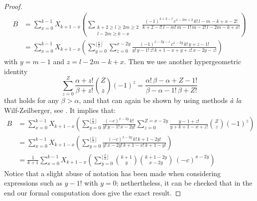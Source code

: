 \documentclass[10pt]{amsart}
\begin{document}
\begin{proof}
 \begin{align*}
 B&=\sum_{x=0}^{k-1}X_{k+1-x}\left(\sum_{\substack{k+2\geq l \geq 2m \geq 2\\l-2m\geq k-x}} \frac{(-1)^{k+2-l}\,c^{x-2m+2}\,k!\,l-m-k+x-2!}{k+2-l!\,l-m!\,m-1!\,m-2!\,l-2m-k+x!}\right)\\
 &=\sum_{x=0}^{k-1}X_{k+1-x}\left(\sum_{y=0}^{\lfloor\frac{x}{2}\rfloor} \sum_{z=0}^{x-2y} \frac{(-1)^{x-2y-z}\,c^{x-2y}\,k!\,y+z-1!}{y!\,y-1!\,z!\,k+1-x+y+z!\,x-2y-z!}\right)
 \end{align*}
 with $y=m-1$ and $z=l-2m-k+x$. Then we use another hypergeometric identity
$$\sum_{z=0}^{Z} \frac{\alpha+z!}{\beta+z!}\binom{Z}{z} (-1)^{z}= \frac{\alpha!\,\beta-\alpha+Z-1!}{\beta-\alpha-1!\,\beta+Z!}$$
that holds for any $\beta> \alpha$, and that can again be shown by using methods \emph{\`a la} Wilf-Zeilberger, see \cite{PWZ97}. It implies that:
\begin{align*}
B&=\sum_{x=0}^{k-1}X_{k+1-x}\left(\sum_{y=0}^{\lfloor \frac{x}{2} \rfloor}\frac{(-c)^{x-2y}\,k!}{y!\,y-1!\,x-2y!}\sum_{z=0}^{Z=x-2y} \frac{y-1+z!}{y+k+1-x+z!}\binom{Z}{z}(-1)^{z}\right)\\
&=\sum_{x=0}^{k-1}X_{k+1-x}\left(\sum_{y=0}^{\lfloor \frac{x}{2} \rfloor}\frac{(-c)^{x-2y}\,k!\,k+1-2y!}{y!\,x-2y!\,k+1-x!\,k+1-y!}\right)\\
&=\frac{1}{k+1}\sum_{x=0}^{k-1}X_{k+1-x}\left(\sum_{y=0}^{\lfloor \frac{x}{2} \rfloor} \binom{k+1}{y}\binom{k+1-2y}{x-2y}\,(-c)^{x-2y}\right)
\end{align*}
Notice that a slight abuse of notation has been made when considering expressions such as $y-1!$ with $y=0$; nethertheless, it can be checked that in the end our formal computation does give the exact result.
\end{proof}
\end{document}
